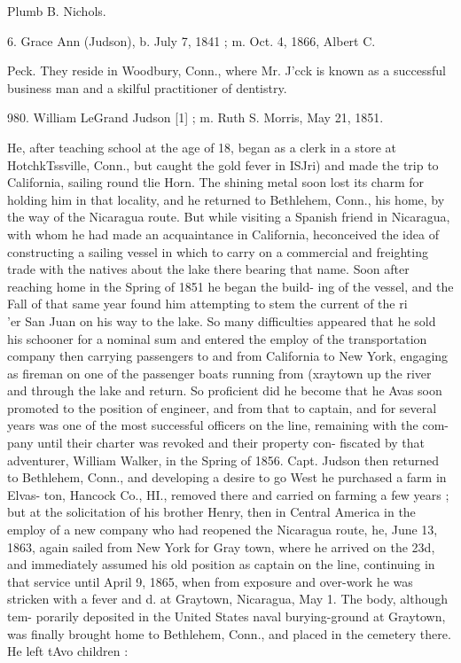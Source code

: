 \documentclass{book}
\begin{document}
Plumb B. Nichols. 

6. Grace Ann (Judson), b. July 7, 1841 ; m. Oct. 4, 1866, Albert C. 

Peck. They reside in Woodbury, Conn., where Mr. J'cck is 
known as a successful business man and a skilful practitioner 
of dentistry. 




980. William LeGrand Judson [1] ; m. Ruth S. Morris, May 21, 1851. 

He, after teaching school at the age of 18, began as a clerk in 
a store at HotchkTssville, Conn., but caught the gold fever in 
ISJri) and made the trip to California, sailing round tlie Horn. 
The shining metal soon lost its charm for holding him in that 
locality, and he returned to Bethlehem, Conn., his home, by 
the way of the Nicaragua route. But while visiting a Spanish 
friend in Nicaragua, with whom he had made an acquaintance 
in California, heconceived the idea of constructing a sailing 
vessel in which to carry on a commercial and freighting trade 
with the natives about the lake there bearing that name. Soon 
after reaching home in the Spring of 1851 he began the build- 
ing of the vessel, and the Fall of that same year found him 
attempting to stem the current of the ri\\'er San Juan on his 
way to the lake. So many difficulties appeared that he sold 
his schooner for a nominal sum and entered the employ of the 
transportation company then carrying passengers to and from 
California to New York, engaging as fireman on one of the 
passenger boats running from (xraytown up the river and 
through the lake and return. So proficient did he become 
that he Avas soon promoted to the position of engineer, and 
from that to captain, and for several years was one of the 
most successful officers on the line, remaining with the com- 
pany until their charter was revoked and their property con- 
fiscated by that adventurer, William Walker, in the Spring of 
1856. Capt. Judson then returned to Bethlehem, Conn., and 
developing a desire to go West he purchased a farm in Elvas- 
ton, Hancock Co., HI., removed there and carried on farming 
a few years ; but at the solicitation of his brother Henry, then 
in Central America in the employ of a new company who had 
reopened the Nicaragua route, he, June 13, 1863, again sailed 
from New York for Gray town, where he arrived on the 23d, 
and immediately assumed his old position as captain on the 
line, continuing in that service until April 9, 1865, when from 
exposure and over-work he was stricken with a fever and d. 
at Graytown, Nicaragua, May 1. The body, although tem- 
porarily deposited in the United States naval burying-ground 
at Graytown, was finally brought home to Bethlehem, Conn., 
and placed in the cemetery there. He left tAvo children : 
\end{document}
